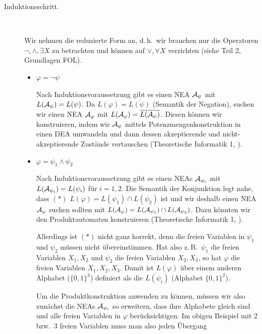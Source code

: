 \documentclass[fontsize=11pt, twoside=false, numbers=autoenddot]{scrbook}
\begin{document}
\begin{beweis}
\begin{description}
    \item[Induktionsschritt.]~
      \par
      Wir nehmen die reduzierte Form an, d.\,h.\
      wir brauchen nur die Operatoren $\lnot,\land,\exists X$ zu betrachten
      und können auf $\lor,\forall X$ verzichten (siehe Teil 2, Grundlagen FOL).
      \begin{itemize}
        \item
          $\varphi = \lnot \psi$
          ~\par
          Nach Induktionsvoraussetzung gibt es einen NEA $\mathcal{A}_\psi$
          mit $L(\mathcal{A}_\psi) = L(\psi)$.
          Da $L(\varphi) = \overline{L(\psi)}$ (Semantik der Negation),
          suchen wir einen NEA $\mathcal{A}_\varphi$ mit $L(\mathcal{A}_\varphi) = \overline{L(\mathcal{A}_\psi)}$.
          Diesen können wir konstruieren, indem wir $\mathcal{A}_\psi$
          mittels Potenzmengenkonstruktion in einen DEA umwandeln 
          und dann dessen akzeptierende und nicht-akzeptierende Zustände vertauschen
          (Theoretische Informatik 1, \cite{SkriptThI}).
        \item
          $\varphi = \psi_1 \land \psi_2$
          ~\par
          Nach Induktionsvoraussetzung gibt es einen NEAs $\mathcal{A}_{\psi_i}$
          mit $L(\mathcal{A}_{\psi_i}) = L(\psi_i)$ für $i=1,2$.
          Die Semantik der Konjunktion legt nahe, dass
          $(*)$ $L(\varphi) = L(\psi_1) \cap L(\psi_2)$ ist
          und wir deshalb einen NEA $\mathcal{A}_\varphi$ suchen sollten
          mit $L(\mathcal{A}_\varphi) = L(\mathcal{A}_{\psi_1}) \cap L(\mathcal{A}_{\psi_2})$.
          Dazu könnten wir den Produktautomaten konstruieren (Theoretische Informatik 1, \cite{SkriptThI}).

          Allerdings ist $(*)$ nicht ganz korrekt,
          denn die freien Variablen in $\psi_1$ und $\psi_2$ müssen nicht übereinstimmen.
          Hat also z.\,B.\ $\psi_1$ die freien Variablen $X_1,X_2$
          und $\psi_2$ die freien Variablen $X_2,X_3$,
          so hat $\varphi$ die freien Variablen $X_1,X_2,X_3$.
          Damit ist $L(\varphi)$ über einem anderen Alphabet ($\{0,1\}^3$)
          definiert als die $L(\psi_i)$ (Alphabet $\{0,1\}^2$).

          Um die Produktkonstruktion anwenden zu können,
          müssen wir also zunächst die NEAs $\mathcal{A}_{\psi_i}$
          so erweitern, dass ihre Alphabete gleich sind und alle
          freien Variablen in $\varphi$ berücksichtigen.
          Im obigen Beispiel mit 2 bzw.\ 3 freien Variablen muss man also
          jeden Übergang
          \begin{center}
\end{center}
\end{itemize}
\end{description}
\end{beweis}
\end{document}
